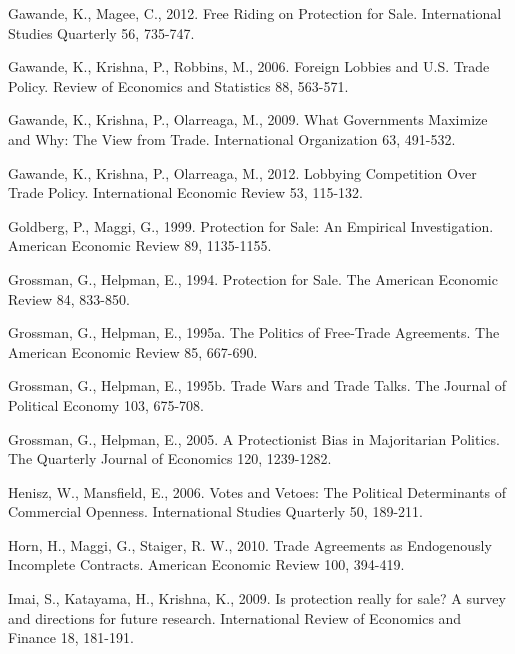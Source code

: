 \documentclass[10pt]{article}
\begin{document}
\begin{list}{}{\setlength{\leftmargin}{0.0in}\setlength{\rightmargin}{0.0in}\setlength{\itemindent}{0.0in}\setlength{\itemsep}{0.1in}}
\item Gawande, K., Magee, C., 2012. Free Riding on Protection for Sale. International Studies Quarterly 56, 735-747.

\item Gawande, K., Krishna, P., Robbins, M., 2006. Foreign Lobbies and U.S. Trade Policy. Review of Economics and Statistics 88, 563-571.

\item Gawande, K., Krishna, P., Olarreaga, M., 2009. What Governments Maximize and Why: The View from Trade. International Organization 63, 491-532.

\item Gawande, K., Krishna, P., Olarreaga, M., 2012. Lobbying Competition Over Trade Policy. International Economic Review 53, 115-132.

\item Goldberg, P., Maggi, G., 1999. Protection for Sale: An Empirical Investigation. American Economic Review 89, 1135-1155.

\item Grossman, G., Helpman, E., 1994. Protection for Sale. The American Economic Review 84, 833-850.

\item Grossman, G., Helpman, E., 1995a. The Politics of Free-Trade Agreements. The American Economic Review 85, 667-690.

\item Grossman, G., Helpman, E., 1995b. Trade Wars and Trade Talks. The Journal of Political Economy 103, 675-708.

\item Grossman, G., Helpman, E., 2005. A Protectionist Bias in Majoritarian Politics. The Quarterly Journal of Economics 120, 1239-1282.

\item Henisz, W., Mansfield, E., 2006. Votes and Vetoes: The Political Determinants of Commercial Openness. International Studies Quarterly 50, 189-211.

\item Horn, H., Maggi, G., Staiger, R. W., 2010. Trade Agreements as Endogenously Incomplete Contracts. American Economic Review 100, 394-419.

\item Imai, S., Katayama, H., Krishna, K., 2009. Is protection really for sale? A survey and directions for future research. International Review of Economics and Finance 18, 181-191.



\end{list}
\end{document}
